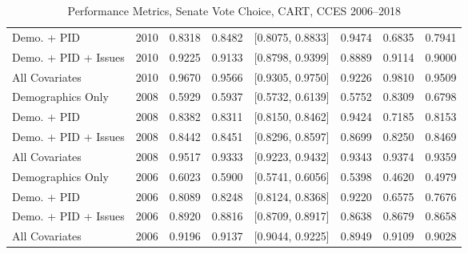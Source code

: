 \begin{table}[H]
\begin{tabular}{lrrrlrrr}
  Demo. + PID & 2010 & 0.8318 & 0.8482 & [0.8075, 0.8833] & 0.9474 & 0.6835 & 0.7941 \\ 
  Demo. + PID + Issues & 2010 & 0.9225 & 0.9133 & [0.8798, 0.9399] & 0.8889 & 0.9114 & 0.9000 \\ 
  All Covariates & 2010 & 0.9670 & 0.9566 & [0.9305, 0.9750] & 0.9226 & 0.9810 & 0.9509 \\ 
  Demographics Only & 2008 & 0.5929 & 0.5937 & [0.5732, 0.6139] & 0.5752 & 0.8309 & 0.6798 \\ 
  Demo. + PID & 2008 & 0.8382 & 0.8311 & [0.8150, 0.8462] & 0.9424 & 0.7185 & 0.8153 \\ 
  Demo. + PID + Issues & 2008 & 0.8442 & 0.8451 & [0.8296, 0.8597] & 0.8699 & 0.8250 & 0.8469 \\ 
  All Covariates & 2008 & 0.9517 & 0.9333 & [0.9223, 0.9432] & 0.9343 & 0.9374 & 0.9359 \\ 
  Demographics Only & 2006 & 0.6023 & 0.5900 & [0.5741, 0.6056] & 0.5398 & 0.4620 & 0.4979 \\ 
  Demo. + PID & 2006 & 0.8089 & 0.8248 & [0.8124, 0.8368] & 0.9220 & 0.6575 & 0.7676 \\ 
  Demo. + PID + Issues & 2006 & 0.8920 & 0.8816 & [0.8709, 0.8917] & 0.8638 & 0.8679 & 0.8658 \\ 
  All Covariates & 2006 & 0.9196 & 0.9137 & [0.9044, 0.9225] & 0.8949 & 0.9109 & 0.9028 \\ 
   \bottomrule
\end{tabular}
\caption{Performance Metrics, Senate Vote Choice, CART, CCES 2006--2018} 
\label{tab:cces_senate_cart}
\end{table}
